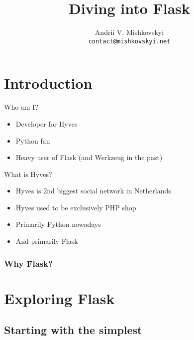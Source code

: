 \documentclass{beamer}
\title{Diving into Flask}
\author[A. Mishkovskyi]{Andrii V. Mishkovskyi \\ \texttt{contact@mishkovskyi.net}}
\date[EuroPython 2012]
\begin{document}
\lstset{
  basicstyle=\ttfamily,
  columns=fixed,
  showspaces=false,
  showstringspaces=false,
}

\section{Introduction}


\begin{frame}{Who am I?}
  \begin{itemize}
  \item Developer for Hyves
  \item Python fan
  \item Heavy user of Flask (and Werkzeug in the past)
  \end{itemize}
\end{frame}

\begin{frame}{What is Hyves?}
  \begin{itemize}
  \item Hyves is 2nd biggest social network in Netherlands
  \item Hyves used to be exclusively PHP shop
  \item Primarily Python nowadays
  \item And primarily Flask
  \end{itemize}
\end{frame}

\begin{frame}
  \frametitle{Why Flask?}
\end{frame}

\section{Exploring Flask}

\subsection{Starting with the simplest}
\end{document}
